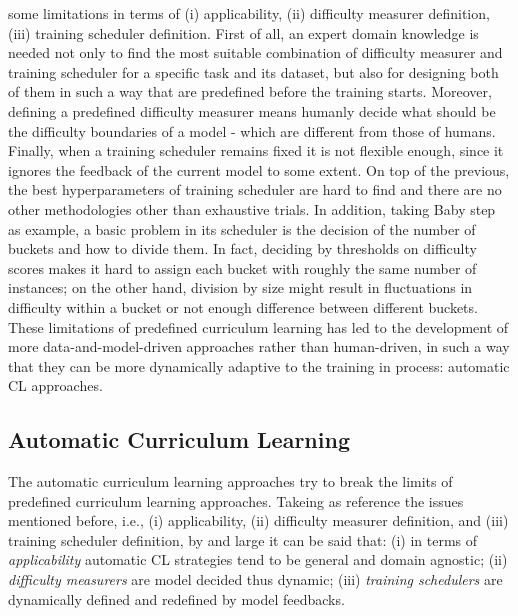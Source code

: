some limitations in terms of (i) applicability, (ii) difficulty measurer definition, (iii) training scheduler definition.
First of all, an expert domain knowledge is needed not only to find the most suitable
combination of difficulty measurer and training scheduler for a specific task and its dataset, 
but also for designing both of them in such a way that are predefined before the training starts.
Moreover, defining a predefined difficulty measurer means humanly decide what should be the difficulty boundaries of a model - which are
different from those of humans. Finally, when a training scheduler remains fixed 
it is not flexible enough, since it ignores the feedback of the current model to some extent.
On top of the previous, the best hyperparameters of training scheduler are hard to find and there are no 
other methodologies other than exhaustive trials. In addition, taking Baby step as example, 
a basic problem in its scheduler is the decision of the number of buckets and how to divide them. In fact, 
deciding by thresholds on difficulty scores makes it hard to assign each bucket with roughly the same number of instances; on 
the other hand, division by size might result in fluctuations in difficulty within a bucket or not enough difference between different 
buckets.\\

These limitations of predefined curriculum learning has led to the development 
of more data-and-model-driven approaches rather than human-driven, in such a way 
that they can be more dynamically adaptive to the training in process: automatic 
CL approaches.

\subsection{Automatic Curriculum Learning}
The automatic curriculum learning approaches try to break the limits of predefined curriculum learning approaches.
Takeing as reference the issues mentioned before, i.e., (i) applicability, (ii) difficulty measurer definition, and (iii) training scheduler definition, 
by and large it can be said that: (i) in terms of \textit{applicability} automatic CL strategies 
tend to be general and domain agnostic; (ii) \textit{difficulty measurers} are model decided thus dynamic; (iii) \textit{training schedulers}
are dynamically defined and redefined by model feedbacks.




